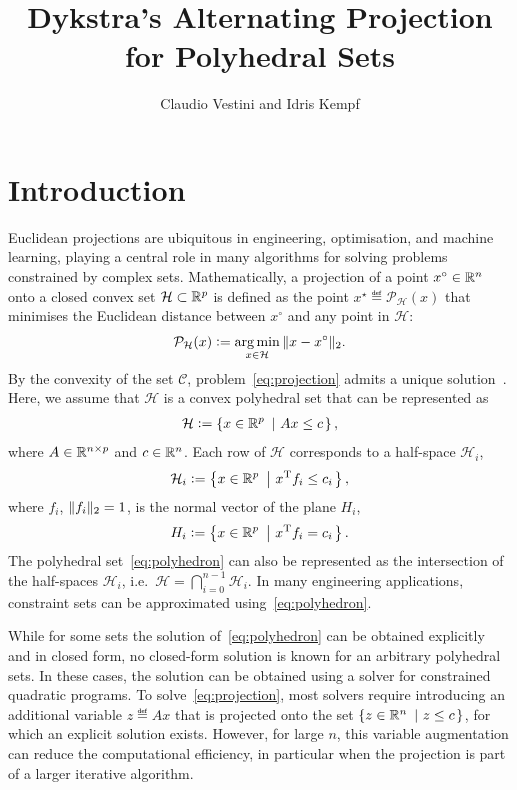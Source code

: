 \documentclass[hidelinks]{article}
\title{Dykstra's Alternating Projection for Polyhedral Sets}
\author{Claudio Vestini and Idris Kempf}
\begin{document}
\maketitle

\section{Introduction}

Euclidean projections are ubiquitous in engineering, optimisation, and machine learning, playing a central role in many algorithms for solving problems constrained by complex sets. Mathematically, a projection of a point $x^\circ\in\mathbb{R}^n$ onto a closed convex set $\mathcal{H}\subset \mathbb{R}^p$ is defined as the point $x^\star\eqdef \mathcal{P}_{\mathcal{H}}(x)$ that minimises the Euclidean distance between $x^\circ$ and any point in $\mathcal{H}$:
\begin{align}\label{eq:projection}
\mathcal{P}_{\mathcal{H}}(x)\vcentcolon= \operatorname*{arg\,min}_{x\in\mathcal{H}}\Vert x-x^\circ \Vert_2.
\end{align}
By the convexity of the set $\mathcal{C}$, problem~\eqref{eq:projection} admits a unique solution~\cite[Ch.\ 3.2]{BAUSCHKEBOOK}. Here, we assume that $\mathcal{H}$ is a convex polyhedral set that can be represented as
\begin{align}\label{eq:polyhedron}
\mathcal{H}\vcentcolon=\left\{ x\in\mathbb{R}^p\ \left| \ A x \leq c \right. \right\},
\end{align}
where $A \in \mathbb{R}^{{n}\times{p}}$ and $c\in\mathbb{R}^n$. Each row of $\mathcal{H}$ corresponds to a half-space $\mathcal{H}_i$,
\begin{align}\label{eq:sets_i}
\mathcal{H}_i\vcentcolon=\left\{ x\in\mathbb{R}^p\ \left| \ x^{\text{T}}f_i \leq c_i \right. \right\},
\end{align}
where $f_i$, $\Vert f_i \Vert_2=1$, is the normal vector of the plane $H_i$,
\begin{align}\label{eq:sets_i2}
H_i\vcentcolon=\left\{ x\in\mathbb{R}^p\ \left| \ x^{\text{T}}f_i = c_i \right. \right\}.
\end{align}
The polyhedral set~\eqref{eq:polyhedron} can also be represented as the intersection of the half-spaces $\mathcal{H}_i$, i.e.\ $\mathcal{H}=\bigcap_{i=0}^{n-1}\mathcal{H}_i$. In many engineering applications, constraint sets can be approximated using~\eqref{eq:polyhedron}.

While for some sets the solution of~\eqref{eq:polyhedron} can be obtained explicitly and in closed form, no closed-form solution is known for an arbitrary polyhedral sets. In these cases, the solution can be obtained using a solver for constrained quadratic programs. To solve~\eqref{eq:projection}, most solvers require introducing an additional variable $z\eqdef Ax$ that is projected onto the set $\left\{ z\in\mathbb{R}^n\ \left| \ z \leq c \right. \right\}$, for which an explicit solution exists. However, for large $n$, this variable augmentation can reduce the computational efficiency, in particular when the projection is part of a larger iterative algorithm.
\end{document}
